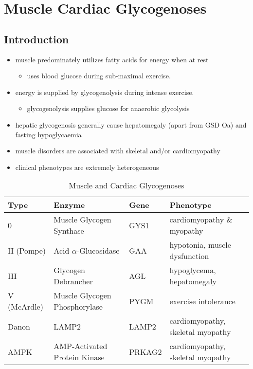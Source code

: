 \documentclass{scrartcl}
\begin{document}
\section{Muscle Cardiac Glycogenoses}
\label{sec:org409fd24}
\subsection{Introduction}
\label{sec:orgd85710b}
\begin{itemize}
\item muscle predominately utilizes fatty acids for energy when at rest
\begin{itemize}
\item uses blood glucose during sub-maximal exercise.
\end{itemize}
\item energy is supplied by glycogenolysis during intense exercise.
\begin{itemize}
\item glycogenolysis supplies glucose for anaerobic glycolysis
\end{itemize}
\item hepatic glycogenosis generally cause hepatomegaly (apart from GSD
Oa) and fasting hypoglycaemia
\item muscle disorders are associated with skeletal and/or
cardiomyopathy
\item clinical phenotypes are extremely heterogeneous
\end{itemize}

\begin{table}[htbp]
\caption{\label{tab:org2f42608}
Muscle and Cardiac Glycogenoses}
\centering
\begin{tabular}{llll}
Type & Enzyme & Gene & Phenotype\\
\hline
0 & Muscle Glycogen Synthase & GYS1 & cardiomyopathy \& myopathy\\
II (Pompe) & Acid \(\alpha\)-Glucosidase & GAA & hypotonia, muscle dysfunction\\
III & Glycogen Debrancher & AGL & hypoglycema, hepatomegaly\\
V (McArdle) & Muscle Glycogen Phosphorylase & PYGM & exercise intolerance\\
Danon & LAMP2 & LAMP2 & cardiomyopathy, \textpm{} skeletal myopathy\\
AMPK & AMP-Activated Protein Kinase & PRKAG2 & cardiomyopathy, \textpm{} skeletal myopathy\\
\end{tabular}
\end{table}
\end{document}
